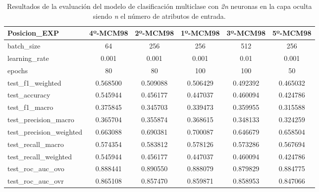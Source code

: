 \begin{table}[H]
\begin{tabular}{|>{\columncolor[HTML]{E0FFFF}}l|c|c|c|c|c|}
\hline
Posicion\_EXP & 4º-MCM98 & 2º-MCM98 & 1º-MCM98 & 3º-MCM98 & 5º-MCM98 \\
\hline
\cellcolor[HTML]{E0FFFF}batch\_size & \cellcolor[HTML]{66ffa8}64 & \cellcolor[HTML]{66ffa8}256 & \cellcolor[HTML]{66ffa8}256 & \cellcolor[HTML]{66ffa8}512 & \cellcolor[HTML]{66ffa8}256 \\
\cellcolor[HTML]{E0FFFF}learning\_rate & \cellcolor[HTML]{f99595}0.001 & \cellcolor[HTML]{f99595}0.001 & \cellcolor[HTML]{f99595}0.001 & \cellcolor[HTML]{f99595}0.01 & \cellcolor[HTML]{f99595}0.001 \\
\cellcolor[HTML]{E0FFFF}epochs & \cellcolor[HTML]{b1bafb}80 & \cellcolor[HTML]{b1bafb}80 & \cellcolor[HTML]{b1bafb}100 & \cellcolor[HTML]{b1bafb}100 & \cellcolor[HTML]{b1bafb}50 \\
\cellcolor[HTML]{E0FFFF}test\_f1\_weighted & 0.568500 & 0.509088 & 0.506429 & 0.492392 & 0.465032 \\
\cellcolor[HTML]{E0FFFF}test\_accuracy & 0.545944 & 0.456177 & 0.447037 & 0.460094 & 0.424786 \\
\cellcolor[HTML]{E0FFFF}test\_f1\_macro & 0.375845 & 0.345703 & 0.339473 & 0.359955 & 0.315588 \\
\cellcolor[HTML]{E0FFFF}test\_precision\_macro & 0.365704 & 0.355874 & 0.368615 & 0.348133 & 0.324259 \\
\cellcolor[HTML]{E0FFFF}test\_precision\_weighted & 0.663088 & 0.690381 & 0.700087 & 0.646679 & 0.658504 \\
\cellcolor[HTML]{E0FFFF}test\_recall\_macro & 0.574354 & 0.583812 & 0.578126 & 0.573286 & 0.567694 \\
\cellcolor[HTML]{E0FFFF}test\_recall\_weighted & 0.545944 & 0.456177 & 0.447037 & 0.460094 & 0.424786 \\
\cellcolor[HTML]{E0FFFF}test\_roc\_auc\_ovo & 0.888441 & 0.890550 & 0.888079 & 0.879829 & 0.884775 \\
\cellcolor[HTML]{E0FFFF}test\_roc\_auc\_ovr & 0.865108 & 0.857470 & 0.859871 & 0.858953 & 0.847066 \\
\hline
\end{tabular}
    \caption{Resultados de la evaluación del modelo de clasificación multiclase con \textit{2n} neuronas en la capa oculta siendo \textit{n} el número de atributos de entrada.}
    \label{fig:EVALMCM98}
\end{table}

